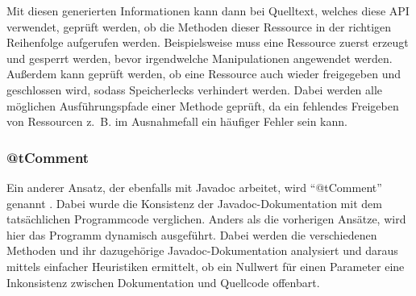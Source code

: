 Mit diesen generierten Informationen kann dann bei Quelltext, welches diese API verwendet, geprüft werden, ob die Methoden dieser Ressource in der richtigen Reihenfolge aufgerufen werden. Beispielsweise muss eine Ressource zuerst erzeugt und gesperrt werden, bevor irgendwelche Manipulationen angewendet werden. Außerdem kann geprüft werden, ob eine Ressource auch wieder freigegeben und geschlossen wird, sodass Speicherlecks verhindert werden. Dabei werden alle möglichen Ausführungspfade einer Methode geprüft, da ein fehlendes Freigeben von Ressourcen z.~B. im Ausnahmefall ein häufiger Fehler sein kann. 

\subsubsection{@tComment}\label{@tComment}
Ein anderer Ansatz, der ebenfalls mit Javadoc arbeitet, wird \enquote{@tComment} genannt \cite[S. 1ff.]{@tComment:TestingJavadocCommentstoDetectComment-CodeInconsistencies}. Dabei wurde die Konsistenz der Javadoc-Dokumentation mit dem tatsächlichen Programmcode verglichen. Anders als die vorherigen Ansätze, wird hier das Programm dynamisch ausgeführt. Dabei werden die verschiedenen Methoden und ihr dazugehörige Javadoc-Dokumentation analysiert und daraus mittels einfacher Heuristiken ermittelt, ob ein  Nullwert für einen Parameter eine Inkonsistenz zwischen Dokumentation und Quellcode offenbart.

